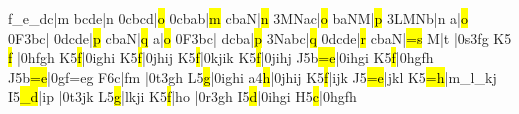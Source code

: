 \barre\notes{}f{_e}{_d}c|\hu m\enotes
\temps\notes{}bcde|\hu n\enotes
\barre\notes\qqb0cbcd|\hl o\enotes
\temps\notes\qqb0cbab|\hl m\enotes
\barre\notes{}cbaN|\hl n\enotes
\temps\notes\qqb3MNac|\hl o\enotes
\barre\notes{}baNM|\hl p\enotes
\temps\notes\qqb3LMNb|\hu n\enotes
\barre\notes{}\ql a\sk|\hl o\enotes
\temps\notes\Ilegl0F\dqb3bc|\enotes
\temps\notes\qqb0dcde|\hl p\enotes
%
\barre\nspace\notes{}cbaN|\hl q\enotes
\temps\notes{}\ql a\sk|\hl o\enotes
\temps\notes\Ilegl0F\dqb3bc|\enotes
\barre\notes{}dcba|\hl p\enotes
\temps\notes\qqb3Nabc|\hl q\enotes
\barre\notes\qqb0dcde|\hl r\enotes
\temps\notes\soufflcr{}cbaN|\hl{=s}\enotes
\barre\nspace\notes{}\ql M|\ql t\cbreath\enotes
\notes{}\soupir|\Ilegu0s\dsoqb3fg\enotes
\temps\arpg K5\relax
\notes {}\hl f\relax
   |\qsoqb0hfgh\enotes
\barre\arpg K5\notes{}\hl f|\qsoqb0ighi\enotes
\temps\arpg K5\notes{}\hl f|\qsoqb0jhij\enotes
\barre\arpg K5\notes{}\hl f|\qsoqb0kjik\enotes
\temps\arpg K5\notes{}\hl f|\qsoqb0jihj\enotes
\barre\Arpg J5\notes{}\lh b\hl{=e}|\qsoqb0ihgi\enotes
\temps\arpg K5\notes{}\hl f|\qsoqb0hgfh\enotes
\barre\Arpg J5\notes{}\lh b\hl{=e}|\qsoqb0gf{=e}g\enotes
\temps\arpg F6\notes{}\ql c|\zq f\ql m\sk\enotes
\notes\soupir|\Ilegu0t\dsoqb3gh\enotes
\barre\Arpg L5\notes{}\hl g|\qsoqb0ighi\enotes
\temps\arpg a4\notes{}\hl h|\qsoqb0jhij\enotes
\barre\Arpg K5\notes{}\hl f|ijk\enotes
\temps\Arpg J5\notes{}\hl{=e}|jkl\enotes
\barre\Arpg K5\notes{}\hl{=h}|m{_l}{_k}j\enotes
\temps\Arpg I5\notes{}\hl{_d}\sk|\zq i\ql p\enotes
\temps\notes|\Ilegu0t\dsoqb3jk\enotes
\barre\Arpg L5\notes{}\hl g|lkji\enotes
\temps\arpg K5\notes{}\hl f\sk|\zq h\ql o\enotes
\temps\notes|\Ilegu0r\dsoqb3gh\enotes
\barre\arpg I5\notes{}\hl d|\qsoqb0ihgi\enotes
\temps\arpg H5\notes{}\hl c|\qsoqb0hgfh\enotes
